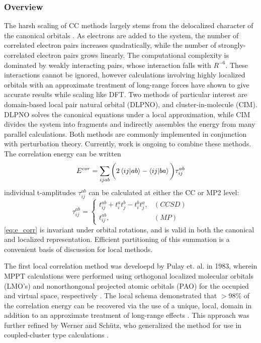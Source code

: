 \subsubsection{Overview}
The harsh scaling of CC methods largely stems from the delocalized character of the canonical orbitals \cite{DLPNOCC,MP2}. As electrons are added to the system, the number of correlated electron pairs increases quadratically, while the number of strongly-correlated electron pairs grows linearly. The computational complexity is dominated by weakly interacting pairs, whose interaction falls with $R^{-6}$. These interactions cannot be ignored, however calculations involving highly localized orbitals with an approximate treatment of long-range forces have shown to give accurate results while scaling like DFT. Two methods of particular interest are domain-based local pair natural orbital (DLPNO), and cluster-in-molecule (CIM). DLPNO solves the canonical equations under a local approximation, while CIM divides the system into fragments and indirectly assembles the energy from many parallel calculations. Both methods are commonly implemented in conjunction with perturbation theory. Currently, work is ongoing to combine these methods. The correlation energy can be written 
\begin{equation}
E^{cor} = \sum_{ijab} \bigg( 2 \braket{ij|ab} - \braket{ij|ba}\bigg) \tau^{ab}_{ij} \label{eq:e_corr}
\end{equation}
individual t-amplitudes $\tau^{ab}_{ij}$ can be calculated at either the CC or MP2 level: 
\begin{equation}
\tau_{ij}^{ab} =
\begin{cases}
t_{ij}^{ab} + t_i^a t_j^b -t_i^b t_j^a  ,&(CCSD)\\
t_{ij}^{ab}, &(MP)
\end{cases}
\end{equation}
\cref{eq:e_corr} is invariant under orbital rotations, and is valid in both the canonical and localized representation. Efficient partitioning of this summation is a convenient basis of discussion for local methods.

The first local correlation method was develoepd by Pulay et. al. in 1983, wherein MPPT calculations were performed using orthogonal localized molecular orbitals (LMO's) and nonorthongonal projected atomic orbitals (PAO) for the occupied and virtual space, respectively \cite{PULAY1983151}. The local schema demonstrated that $>98\%$ of the correlation energy can be recovered via the use of a unique, local, domain in addition to an approximate treatment of long-range effects \cite{doi:10.1063/1.454111,SAEBO198513,doi:10.1146/annurev.pc.44.100193.001241}. This approach was further refined by Werner and Schütz, who generalized the method for use in coupled-cluster type calculations  \cite{doi:10.1063/1.471289, doi:10.1063/1.1330207,doi:10.1063/1.3696963,doi:10.1063/1.3641642}.

